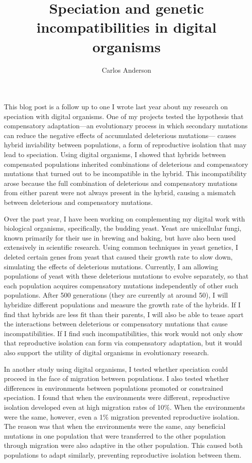 \documentclass[12pt]{article}
\title{Speciation and genetic incompatibilities in digital organisms}
\author{Carlos Anderson}
\begin{document}
\maketitle

\baselineskip 24pt


This blog post is a follow up to one I wrote last year
about my research on speciation with digital organisms.
%
One of my projects tested the hypothesis that
compensatory adaptation---an evolutionary process
in which secondary mutations can reduce
the negative effects of accumulated deleterious mutations---%
causes hybrid inviability between populations,
a form of reproductive isolation that may lead to speciation.
%
Using digital organisms, I showed that hybrids
between compensated populations inherited combinations
of deleterious and compensatory mutations
that turned out to be incompatible in the hybrid.
%
This incompatibility arose because
the full combination of deleterious and compensatory mutations
from either parent were not always present in the hybrid,
causing a mismatch between deleterious and compensatory mutations.



Over the past year, I have been working on complementing
my digital work with biological organisms, specifically, the budding yeast.
%
Yeast are unicellular fungi,
known primarily for their use in brewing and baking,
but have also been used extensively in scientific research.
%
Using common techniques in yeast genetics,
I deleted certain genes from yeast that
caused their growth rate to slow down,
simulating the effects of deleterious mutations.
%
Currently, I am allowing populations of yeast
with these deleterious mutations to evolve separately,
so that each population acquires compensatory mutations
independently of other such populations.
%
After 500 generations (they are currently at around 50),
I will hybridize different populations
and measure the growth rate of the hybrids.
%
If I find that hybrids are less fit than their parents,
I will also be able to tease apart the interactions
between deleterious or compensatory mutations
that cause incompatibilities.
%
If I find such incompatibilities,
this work would not only show that reproductive isolation
can form via compensatory adaptation,
but it would also support the utility of digital organisms
in evolutionary research.



In another study using digital organisms,
I tested whether speciation could proceed
in the face of migration between populations.
%
I also tested whether differences in environments
between populations promoted or constrained speciation.
%
I found that when the environments were different,
reproductive isolation developed even at
high migration rates of 10\%.
%
When the environments were the same, however,
even a 1\% migration prevented reproductive isolation.
%
The reason was that when the environments were the same,
any beneficial mutations in one population
that were transferred to the other population through migration
were also adaptive in the other population.
%
This caused both populations to adapt similarly,
preventing reproductive isolation between them.
\end{document}
